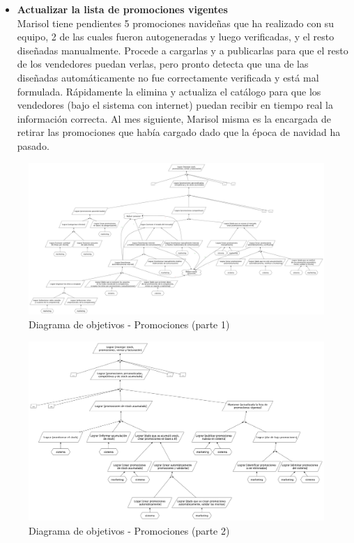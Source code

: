 \begin{itemize}
  \item \textbf{Actualizar la lista de promociones vigentes} \\
    Marisol tiene pendientes 5 promociones navideñas que ha realizado con su equipo, 2 de las cuales fueron autogeneradas y luego verificadas, y el resto diseñadas manualmente. Procede a cargarlas y a publicarlas para que el resto de los vendedores puedan verlas, pero pronto detecta que una de las diseñadas automáticamente no fue correctamente verificada y está mal formulada. Rápidamente la elimina y actualiza el catálogo para que los vendedores (bajo el sistema con internet) puedan recibir en tiempo real la información correcta. Al mes siguiente, Marisol misma es la encargada de retirar las promociones que había cargado dado que la época de navidad ha pasado. 
\end{itemize}

\clearpage

\begin{figure}[h!]
  \centering
  \includegraphics[width=1.5\textwidth, angle=90]{./imagenes/promociones_1.pdf}
  \caption{Diagrama de objetivos - Promociones (parte 1)}
  \label{fig:diagProm1}
\end{figure}

\clearpage


\begin{figure}[h!]
  \centering
  \includegraphics[width=1.3\textwidth, angle=90]{./imagenes/promociones_2.pdf}
  \caption{Diagrama de objetivos - Promociones (parte 2)}
  \label{fig:diagProm2}
\end{figure}

